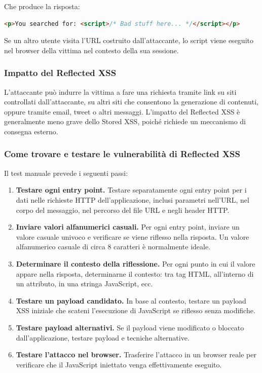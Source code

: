 \documentclass[12pt,a4paper]{report}
\begin{document}
	Che produce la risposta:
	
	\begin{lstlisting}[language=HTML]
		<p>You searched for: <script>/* Bad stuff here... */</script></p>
	\end{lstlisting}
	
	Se un altro utente visita l'URL costruito dall'attaccante, lo script viene eseguito nel browser della vittima nel contesto della sua sessione.
	
	\subsubsection{Impatto del Reflected XSS}
	
	L'attaccante può indurre la vittima a fare una richiesta tramite link su siti controllati dall'attaccante, su altri siti che consentono la generazione di contenuti, oppure tramite email, tweet o altri messaggi. L'impatto del Reflected XSS è generalmente meno grave dello Stored XSS, poiché richiede un meccanismo di consegna esterno.
	
	\subsubsection{Come trovare e testare le vulnerabilità di Reflected XSS}
	
	Il test manuale prevede i seguenti passi:
	
	\begin{enumerate}
		\item \textbf{Testare ogni entry point.} Testare separatamente ogni entry point per i dati nelle richieste HTTP dell'applicazione, inclusi parametri nell'URL, nel corpo del messaggio, nel percorso del file URL e negli header HTTP.
		\item \textbf{Inviare valori alfanumerici casuali.} Per ogni entry point, inviare un valore casuale univoco e verificare se viene riflesso nella risposta. Un valore alfanumerico casuale di circa 8 caratteri è normalmente ideale.
		\item \textbf{Determinare il contesto della riflessione.} Per ogni punto in cui il valore appare nella risposta, determinarne il contesto: tra tag HTML, all'interno di un attributo, in una stringa JavaScript, ecc.
		\item \textbf{Testare un payload candidato.} In base al contesto, testare un payload XSS iniziale che scateni l'esecuzione di JavaScript se riflesso senza modifiche.
		\item \textbf{Testare payload alternativi.} Se il payload viene modificato o bloccato dall'applicazione, testare payload e tecniche alternative.
		\item \textbf{Testare l'attacco nel browser.} Trasferire l'attacco in un browser reale per verificare che il JavaScript iniettato venga effettivamente eseguito.
	\end{enumerate}
	
\end{document}
